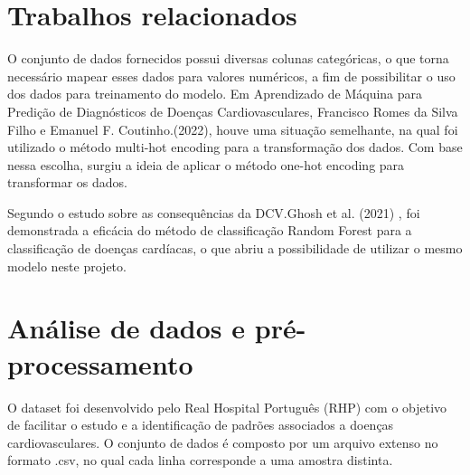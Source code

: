 \documentclass[10pt, conference, compsocconf]{IEEEtran}
\begin{document}
\section{Trabalhos relacionados}
O conjunto de dados fornecidos possui diversas colunas categóricas, o que torna necessário mapear esses dados para valores numéricos, a fim de 
possibilitar o uso dos dados para treinamento do modelo. Em Aprendizado de Máquina para Predição de Diagnósticos de Doenças Cardiovasculares,
Francisco Romes da Silva Filho e Emanuel F. Coutinho.(2022)\cite{IEEEhowto:kopka}, houve uma situação semelhante, na qual foi utilizado o método 
multi-hot encoding para a transformação dos dados. Com base nessa escolha, surgiu a ideia de aplicar o método one-hot encoding para transformar os dados.

Segundo o estudo sobre as consequências da DCV.Ghosh et al. (2021) \cite{citekey}, foi demonstrada a eficácia do método de classificação Random Forest para a 
classificação de doenças cardíacas, o que abriu a possibilidade de utilizar o mesmo modelo neste projeto.



\section{Análise de dados e pré-processamento}
O dataset foi desenvolvido pelo Real Hospital Português (RHP) com o objetivo de facilitar o estudo e a identificação de padrões 
associados a doenças cardiovasculares. O conjunto de dados é composto por um arquivo extenso no formato .csv, no qual cada 
linha corresponde a uma amostra distinta.
\end{document}
